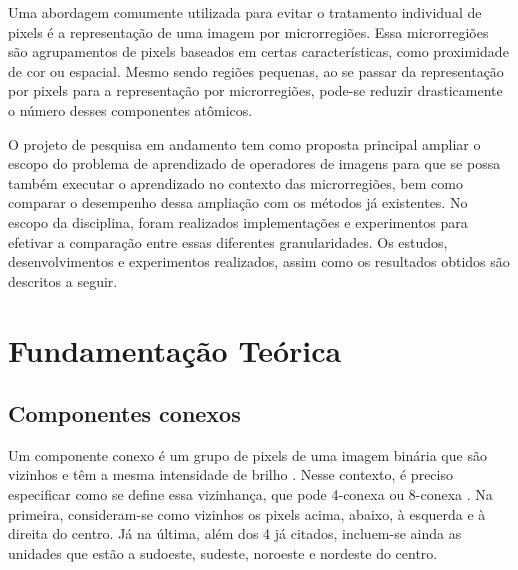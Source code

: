 \documentclass{article}
\begin{document}
	Uma abordagem comumente utilizada para evitar o tratamento individual
	de pixels é a representação de uma imagem por microrregiões. 
	Essa microrregiões são agrupamentos de pixels baseados em certas características, como proximidade de cor ou espacial. 
	Mesmo sendo regiões pequenas, ao se passar da representação por pixels para a representação por microrregiões, pode-se reduzir drasticamente o número desses componentes atômicos.
	
	O projeto de pesquisa em andamento tem como proposta principal ampliar o escopo do problema de aprendizado de operadores de imagens para que se possa também executar o aprendizado no contexto das microrregiões, bem como comparar o desempenho dessa ampliação com os métodos já existentes. No escopo da disciplina, foram realizados implementações e experimentos para efetivar a comparação entre essas diferentes granularidades. Os estudos, desenvolvimentos e experimentos realizados, assim como os resultados obtidos são descritos a seguir.
	
	\section{Fundamentação Teórica}
	\subsection{Componentes conexos}
		Um componente conexo é um grupo de pixels de uma imagem binária que são vizinhos e têm a mesma intensidade de brilho \cite{2017:Sib}. Nesse contexto, é preciso especificar como se define essa vizinhança, que pode 4-conexa ou 8-conexa \cite{Soille:2003}. Na primeira, consideram-se como vizinhos os pixels acima, abaixo, à esquerda e à direita do centro. Já na última, além dos 4 já citados, incluem-se ainda as unidades que estão a sudoeste, sudeste, noroeste e nordeste do centro. 
		
\end{document}
